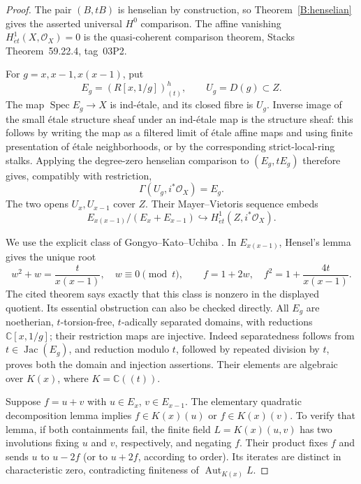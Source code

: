 \begin{proof}
The pair $(B,tB)$ is henselian by construction, so Theorem~\ref{B:henselian} gives the asserted universal $H^0$ comparison. The affine vanishing $H^1_{\acute et}(X,\mathcal O_X)=0$ is the quasi-coherent comparison theorem, Stacks Theorem~59.22.4, tag~03P2.

For $g=x,x-1,x(x-1)$, put
\[
 E_g=(R[x,1/g])^h_{(t)},\qquad U_g=D(g)\subset Z.
\]
The map $\operatorname{Spec}E_g\to X$ is ind-\'etale, and its closed fibre is $U_g$. Inverse image of the small \'etale structure sheaf under an ind-\'etale map is the structure sheaf: this follows by writing the map as a filtered limit of \'etale affine maps and using finite presentation of \'etale neighborhoods, or by the corresponding strict-local-ring stalks. Applying the degree-zero henselian comparison to $(E_g,tE_g)$ therefore gives, compatibly with restriction,
\[
 \Gamma(U_g,i^*\mathcal O_X)=E_g.
\]
The two opens $U_x,U_{x-1}$ cover $Z$. Their Mayer--Vietoris sequence embeds
\[
 E_{x(x-1)}/(E_x+E_{x-1})
 \hookrightarrow H^1_{\acute et}(Z,i^*\mathcal O_X).
\]

We use the explicit class of Gongyo--Kato--Uchiba \cite[Definition 1.3 and Theorem 3.2, pp.~2, 5--7]{BGongyoKatoUchiba2026}. In $E_{x(x-1)}$, Hensel's lemma gives the unique root
\[
 w^2+w=\frac{t}{x(x-1)},\quad w\equiv0\pmod t,
 \qquad f=1+2w,\quad f^2=1+\frac{4t}{x(x-1)}.
\]
The cited theorem says exactly that this class is nonzero in the displayed quotient. Its essential obstruction can also be checked directly. All $E_g$ are noetherian, $t$-torsion-free, $t$-adically separated domains, with reductions $\mathbb C[x,1/g]$; their restriction maps are injective. Indeed separatedness follows from $t\in\operatorname{Jac}(E_g)$, and reduction modulo $t$, followed by repeated division by $t$, proves both the domain and injection assertions. Their elements are algebraic over $K(x)$, where $K=\mathbb C((t))$.

Suppose $f=u+v$ with $u\in E_x$, $v\in E_{x-1}$. The elementary quadratic decomposition lemma \cite[Lemma 3.1]{BGongyoKatoUchiba2026} implies $f\in K(x)(u)$ or $f\in K(x)(v)$. To verify that lemma, if both containments fail, the finite field $L=K(x)(u,v)$ has two involutions fixing $u$ and $v$, respectively, and negating $f$. Their product fixes $f$ and sends $u$ to $u-2f$ (or to $u+2f$, according to order). Its iterates are distinct in characteristic zero, contradicting finiteness of $\operatorname{Aut}_{K(x)}L$.


\end{proof}
